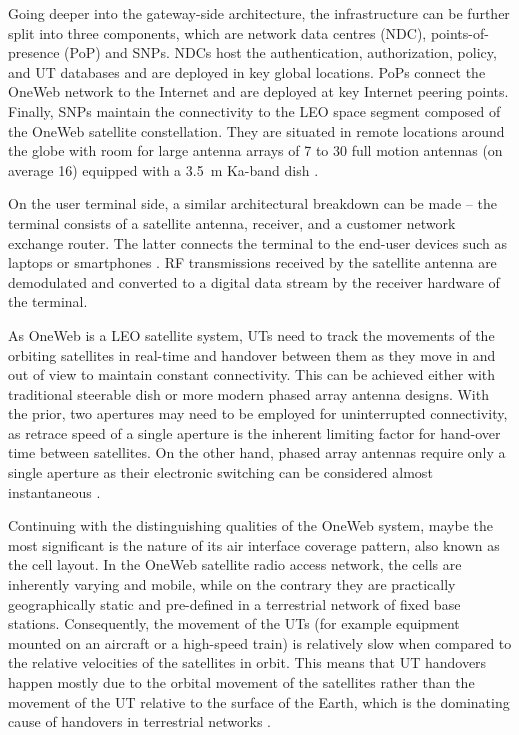 \documentclass[english, 12pt, a4paper, elec, utf8, a-1b, online]{aaltothesis}
\begin{document}
Going deeper into the gateway-side architecture, the infrastructure can be further split into three components, which are network data centres (NDC), points-of-presence (PoP) and SNPs.
NDCs host the authentication, authorization, policy, and UT databases and are deployed in key global locations.
PoPs connect the OneWeb network to the Internet and are deployed at key Internet peering points.
Finally, SNPs maintain the connectivity to the LEO space segment composed of the OneWeb satellite constellation.
They are situated in remote locations around the globe with room for large antenna arrays of 7 to 30 full motion antennas (on average 16) equipped with a \SI{3.5}{\meter} Ka-band dish \cite{henri2020oneweb}.

On the user terminal side, a similar architectural breakdown can be made -- the terminal consists of a satellite antenna, receiver, and a customer network exchange router.
The latter connects the terminal to the end-user devices such as laptops or smartphones \cite{henri2020oneweb}. RF transmissions received by the satellite antenna are demodulated and converted to a digital data stream by the receiver hardware of the terminal.

As OneWeb is a LEO satellite system, UTs need to track the movements of the orbiting satellites in real-time and handover between them as they move in and out of view to maintain constant connectivity.
This can be achieved either with traditional steerable dish or more modern phased array antenna designs.
With the prior, two apertures may need to be employed for uninterrupted connectivity, as retrace speed of a single aperture is the inherent limiting factor for hand-over time between satellites.
On the other hand, phased array antennas require only a single aperture as their electronic switching can be considered almost instantaneous \cite{worldvu2016loi}.

Continuing with the distinguishing qualities of the OneWeb system, maybe the most significant is the nature of its air interface coverage pattern, also known as the cell layout.
In the OneWeb satellite radio access network, the cells are inherently varying and mobile, while on the contrary they are practically geographically static and pre-defined in a terrestrial network of fixed base stations.
Consequently, the movement of the UTs (for example equipment mounted on an aircraft or a high-speed train) is relatively slow when compared to the relative velocities of the satellites in orbit.
This means that UT handovers happen mostly due to the orbital movement of the satellites rather than the movement of the UT relative to the surface of the Earth, which is the dominating cause of handovers in terrestrial networks \cite{corson2019admission}.
\end{document}
